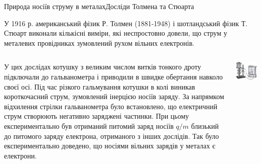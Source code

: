 \documentclass[onlytextwidth]{beamer}
\begin{document}
\begin{frame}{Природа носіїв струму в металах}{Досліди Толмена та Стюарта}\small
	\begin{block}{}\justifying
		У 1916 р. американський фізик Р. Толмен (1881-1948) і шотландський фізик Т. Стюарт виконали
		кількісні виміри, які неспростовно довели, що струм у металевих провідниках зумовлений рухом
		вільних електронів.
	\end{block}
	\begin{columns}
		\begin{column}{0.65\linewidth}
			\begin{block}{}\justifying
				У цих дослідах котушку з великим числом витків тонкого дроту підключали до гальванометра і
				приводили в швидке обертання навколо своєї осі. Під час різкого гальмування котушки в колі
				виникав короткочасний струм, зумовлений інерцією носіїв заряду. За напрямком відхилення
				стрілки гальванометра було встановлено, що \alert{електричний струм створюють негативно
					заряджені частинки}. При цьому експериментально був отриманий питомий заряд носіїв $q/m$
				близький до питомого заряду електрона, отриманого з інших дослідів. Так було експериментально
				доведено, що носіями вільних зарядів у металах є електрони.
			\end{block}
		\end{column}
		\hfill
		\begin{column}{0.3\linewidth}\centering
			\includegraphics[width=\linewidth]{exptommstuart}

\end{column}
\end{columns}
\end{frame}
\end{document}
